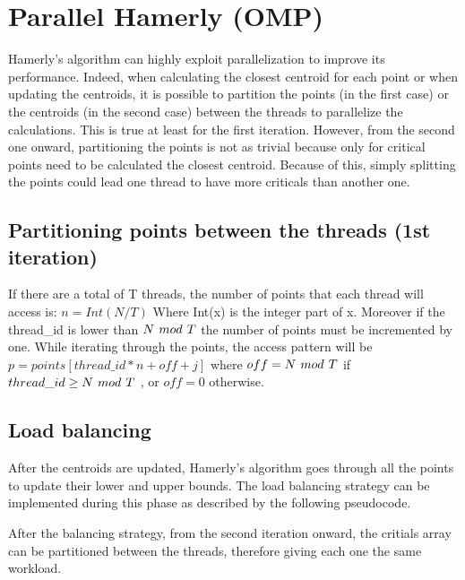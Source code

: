 \documentclass[conference]{IEEEtran}
\begin{document}
\section{Parallel Hamerly (OMP)}
Hamerly's algorithm can highly exploit parallelization to improve its performance. Indeed, when calculating the closest centroid for each point or when updating the centroids, it is possible to partition the points (in the first case) or the centroids (in the second case) between the threads to parallelize the calculations.
This is true at least for the first iteration. However, from the second one onward, partitioning the points is not as trivial because only for critical points need to be calculated the closest centroid. Because of this, simply splitting the points could lead one thread to have more criticals than another one.

\subsection{Partitioning points between the threads (1st iteration)}
If there are a total of T threads, the number of points that each thread will access is: $n = Int(N / T)$
Where Int(x) is the integer part of x. Moreover if the thread\_id is lower than $N\hspace{0.05in} mod\hspace{0.05in} T$ the number of points must be incremented by one. While iterating through the points, the access pattern will be $p = points[ thread\_id * n + off + j]$ where $off = N\hspace{0.05in} mod\hspace{0.05in} T$ if $thread\_id \geq N\hspace{0.05in} mod\hspace{0.05in} T $ , or $off = 0$ otherwise. 

\subsection{Load balancing}

After the centroids are updated, Hamerly's algorithm goes through all the points to update their lower and upper bounds. The load balancing strategy can be implemented during this phase as described by the following pseudocode.

After the balancing strategy, from the second iteration onward, the critials array can be partitioned between the threads, therefore giving each one the same workload.
\end{document}
